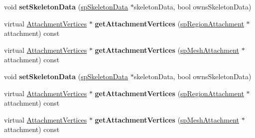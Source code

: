 \begin{DoxyCompactItemize}
\item 
\mbox{\label{classspine_1_1SkeletonRenderer_a9ff45d11f3f4e7080ae5c45b29b5785c}} 
void {\bfseries set\+Skeleton\+Data} (\hyperlink{structspSkeletonData}{sp\+Skeleton\+Data} $\ast$skeleton\+Data, bool owns\+Skeleton\+Data)
\item 
\mbox{\label{classspine_1_1SkeletonRenderer_a7a4824b32fbc002020059185392000a9}} 
virtual \hyperlink{classspine_1_1AttachmentVertices}{Attachment\+Vertices} $\ast$ {\bfseries get\+Attachment\+Vertices} (\hyperlink{structspRegionAttachment}{sp\+Region\+Attachment} $\ast$attachment) const
\item 
\mbox{\label{classspine_1_1SkeletonRenderer_a66888357146c620892a3d55d53423faf}} 
virtual \hyperlink{classspine_1_1AttachmentVertices}{Attachment\+Vertices} $\ast$ {\bfseries get\+Attachment\+Vertices} (\hyperlink{structspMeshAttachment}{sp\+Mesh\+Attachment} $\ast$attachment) const
\item 
\mbox{\label{classspine_1_1SkeletonRenderer_a9ff45d11f3f4e7080ae5c45b29b5785c}} 
void {\bfseries set\+Skeleton\+Data} (\hyperlink{structspSkeletonData}{sp\+Skeleton\+Data} $\ast$skeleton\+Data, bool owns\+Skeleton\+Data)
\item 
\mbox{\label{classspine_1_1SkeletonRenderer_a42a647c34aa1db76c15c9558b1fe12d3}} 
virtual \hyperlink{classspine_1_1AttachmentVertices}{Attachment\+Vertices} $\ast$ {\bfseries get\+Attachment\+Vertices} (\hyperlink{structspRegionAttachment}{sp\+Region\+Attachment} $\ast$attachment) const
\item 
\mbox{\label{classspine_1_1SkeletonRenderer_a3e503033564116c30c876d8aef4ff2c6}} 
virtual \hyperlink{classspine_1_1AttachmentVertices}{Attachment\+Vertices} $\ast$ {\bfseries get\+Attachment\+Vertices} (\hyperlink{structspMeshAttachment}{sp\+Mesh\+Attachment} $\ast$attachment) const
\end{DoxyCompactItemize}
